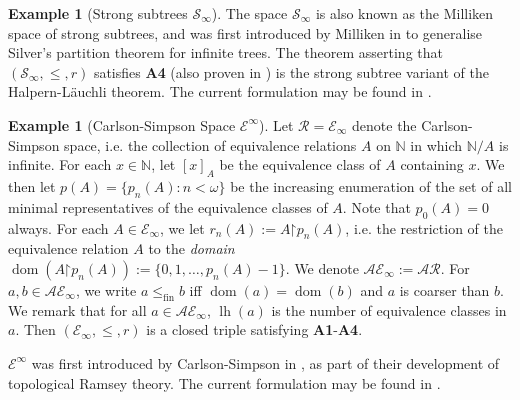 \documentclass[11pt,reqno]{amsart}
\theoremstyle{plain}
\numberwithin{equation}{section}
\theoremstyle{definition}
\newtheorem{example}[theorem]{Example}
\newcommand{\func}{\operatorname}
\newcommand{\N}{\mathbb{N}}
\newcommand{\cal}{\mathcal}
\newcommand{\dom}{\func{dom}}
\newcommand{\restrictedto}{\mathord{\upharpoonright}}
\newcommand{\lh}{\func{lh}}
\newcommand{\fin}{\mathrm{fin}}
\newcommand{\E}{\cal{E}}
\renewcommand{\S}{\mathcal{S}}
\begin{document}
\begin{example}[Strong subtrees $\S_\infty$]
    The space $\S_\infty$ is also known as the Milliken space of strong subtrees, and was first introduced by Milliken in \cite{M81} to generalise Silver's partition theorem for infinite trees. The theorem asserting that $(\S_\infty,\leq,r)$ satisfies \textbf{A4} (also proven in \cite{M81}) is the strong subtree variant of the Halpern-L\"{a}uchli theorem. The current formulation may be found in \cite{T10}.
\end{example}

\begin{example}[Carlson-Simpson Space $\E^\infty$]
\label{ex:carlson-simpson}
    Let $\cal{R} = \E_\infty$ denote the Carlson-Simpson space, i.e. the collection of equivalence relations $A$ on $\mathbb{N}$ in which $\mathbb{N}/A$ is infinite. For each $x \in \N$, let $[x]_A$ be the equivalence class of $A$ containing $x$. We then let $p(A) = \{p_n(A) : n < \omega\}$ be the increasing enumeration of the set of all minimal representatives of the equivalence classes of $A$. Note that $p_0(A) = 0$ always. For each $A \in \E_\infty$, we let $r_n(A) := A\restrictedto p_n(A)$, i.e. the restriction of the equivalence relation $A$ to the \emph{domain} $\dom(A\restrictedto p_n(A)) := \{0,1,\dots,p_n(A) - 1\}$. We denote $\cal{AE}_\infty := \cal{AR}$. For $a,b \in \cal{AE}_\infty$, we write $a \leq_\fin b$ iff $\dom(a) = \dom(b)$ and $a$ is coarser than $b$. We remark that for all $a \in \cal{AE}_\infty$, $\lh(a)$ is the number of equivalence classes in $a$. Then $(\E_\infty,\leq,r)$ is a closed triple satisfying \textbf{A1}-\textbf{A4}. 
    
    $\E^\infty$ was first introduced by Carlson-Simpson in \cite{CS90}, as part of their development of topological Ramsey theory. The current formulation may be found in \cite{T10}.
\end{example}
\end{document}
